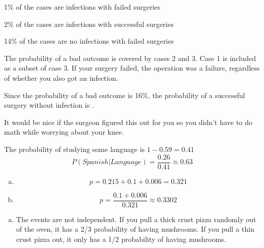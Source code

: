 \documentclass[letterpaper, landscape]{exam}
\begin{document}
\begin{description}
\begin{enumerate}[(a)]
        \end{enumerate}

      \item[32]
        \begin{enumerate*}
          \item 1\% of the cases are infections with failed surgeries
          \item 2\% of the cases are infections with successful surgeries
          \item 14\% of the cases are no infections with failed surgeries
        \end{enumerate*}

        The probability of a bad outcome is covered by cases 2 and 3. Case 1 is
        included as a subset of case 3. If your surgery failed, the operation
        was a failure, regardless of whether you also got an infection.

        Since the probability of a bad outcome is 16\%, the probability of a
        successful surgery without infection is .

        It would be nice if the surgeon figured this out for you so you didn't
        have to do math while worrying about your knee.


      \item[34]
        The probability of studying some language is $1 - 0.59 = 0.41$
        \[
          P(Spanish | Language) = \frac{0.26}{0.41} \approx 0.63
        \]

      \item[35]
        \begin{enumerate}[(a)]
          \item 
            \[
              p = 0.215 + 0.1 + 0.006 = \boxed{ 0.321 }
            \]

          \item
            \[
              p = \frac{0.1 + 0.006}{0.321} \approx \boxed{ 0.3302 }
            \]
        \end{enumerate}

      \item[36]
        \begin{enumerate}[(a)]
          \item The events are not independent. If you pull a thick crust pizza
            randomly out of the oven, it has a 2/3 probability of having
            mushrooms. If you pull a thin crust pizza out, it only has a 1/2
            probability of having mushrooms.


\end{enumerate}
\end{description}
\end{document}
